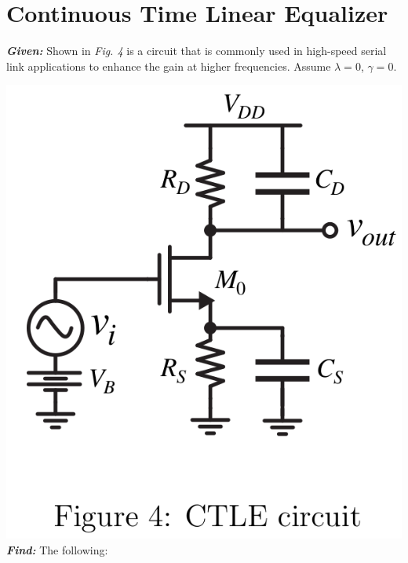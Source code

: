 \documentclass[12pt, fleqn]{article}
\begin{document}
\section{Continuous Time Linear Equalizer}
\textbf{\emph{Given: }} Shown in \textit{Fig. 4} is a circuit that is commonly used in high-speed serial link applications to enhance the gain at higher frequencies. Assume $\lambda = 0$, $\gamma = 0$.

\includegraphics[scale=0.25, center]{p2f4.PNG}\\
\textbf{\emph{Find: }} The following:
\end{document}
